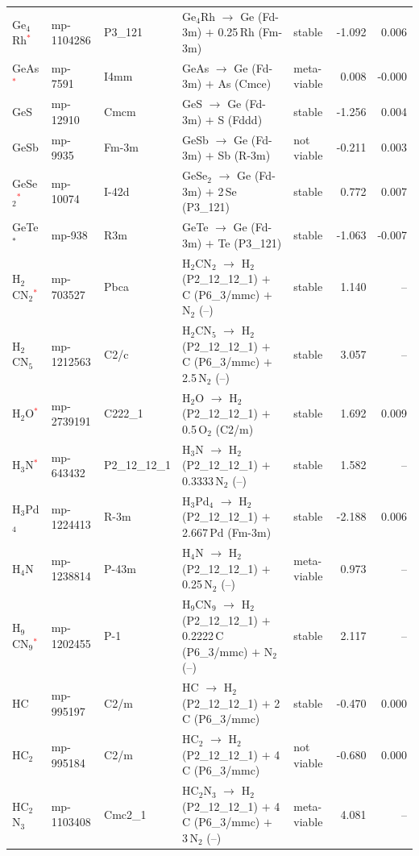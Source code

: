 \begin{longtable}{@{}ll l@{\hspace{4pt}} p{4.6cm} l@{\hspace{4pt}} rr@{}}
Ge$_{4}$Rh\textcolor{red}{$^*$} & mp-1104286 & P3\_121 & Ge$_{4}$Rh $\to$ Ge (Fd-3m) $+$ 0.25\,Rh (Fm-3m) & stable & -1.092 & 0.006 \\
GeAs\textcolor{red}{$^*$} & mp-7591 & I4mm & GeAs $\to$ Ge (Fd-3m) $+$ As (Cmce) & meta-viable & 0.008 & -0.000 \\
GeS & mp-12910 & Cmcm & GeS $\to$ Ge (Fd-3m) $+$ S (Fddd) & stable & -1.256 & 0.004 \\
GeSb & mp-9935 & Fm-3m & GeSb $\to$ Ge (Fd-3m) $+$ Sb (R-3m) & not viable & -0.211 & 0.003 \\
GeSe$_{2}$\textcolor{red}{$^*$} & mp-10074 & I-42d & GeSe$_{2}$ $\to$ Ge (Fd-3m) $+$ 2\,Se (P3\_121) & stable & 0.772 & 0.007 \\
GeTe$^*$ & mp-938 & R3m & GeTe $\to$ Ge (Fd-3m) $+$ Te (P3\_121) & stable & -1.063 & -0.007 \\
H$_{2}$CN$_{2}$\textcolor{red}{$^*$} & mp-703527 & Pbca & H$_{2}$CN$_{2}$ $\to$ H$_{2}$ (P2\_12\_12\_1) $+$ C (P6\_3/mmc) $+$ N$_{2}$ (--) & stable & 1.140 & -- \\
H$_{2}$CN$_{5}$ & mp-1212563 & C2/c & H$_{2}$CN$_{5}$ $\to$ H$_{2}$ (P2\_12\_12\_1) $+$ C (P6\_3/mmc) $+$ 2.5\,N$_{2}$ (--) & stable & 3.057 & -- \\
H$_{2}$O\textcolor{red}{$^*$} & mp-2739191 & C222\_1 & H$_{2}$O $\to$ H$_{2}$ (P2\_12\_12\_1) $+$ 0.5\,O$_{2}$ (C2/m) & stable & 1.692 & 0.009 \\
H$_{3}$N\textcolor{red}{$^*$} & mp-643432 & P2\_12\_12\_1 & H$_{3}$N $\to$ H$_{2}$ (P2\_12\_12\_1) $+$ 0.3333\,N$_{2}$ (--) & stable & 1.582 & -- \\
H$_{3}$Pd$_{4}$ & mp-1224413 & R-3m & H$_{3}$Pd$_{4}$ $\to$ H$_{2}$ (P2\_12\_12\_1) $+$ 2.667\,Pd (Fm-3m) & stable & -2.188 & 0.006 \\
H$_{4}$N & mp-1238814 & P-43m & H$_{4}$N $\to$ H$_{2}$ (P2\_12\_12\_1) $+$ 0.25\,N$_{2}$ (--) & meta-viable & 0.973 & -- \\
H$_{9}$CN$_{9}$\textcolor{red}{$^*$} & mp-1202455 & P-1 & H$_{9}$CN$_{9}$ $\to$ H$_{2}$ (P2\_12\_12\_1) $+$ 0.2222\,C (P6\_3/mmc) $+$ N$_{2}$ (--) & stable & 2.117 & -- \\
HC & mp-995197 & C2/m & HC $\to$ H$_{2}$ (P2\_12\_12\_1) $+$ 2\,C (P6\_3/mmc) & stable & -0.470 & 0.000 \\
HC$_{2}$ & mp-995184 & C2/m & HC$_{2}$ $\to$ H$_{2}$ (P2\_12\_12\_1) $+$ 4\,C (P6\_3/mmc) & not viable & -0.680 & 0.000 \\
HC$_{2}$N$_{3}$ & mp-1103408 & Cmc2\_1 & HC$_{2}$N$_{3}$ $\to$ H$_{2}$ (P2\_12\_12\_1) $+$ 4\,C (P6\_3/mmc) $+$ 3\,N$_{2}$ (--) & meta-viable & 4.081 & -- \\

\end{longtable}

